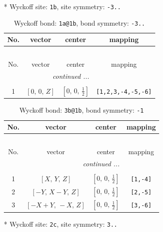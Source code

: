\documentclass[fleqn,8pt]{jsarticle}
\begin{document}
* Wyckoff site: {\tt 1b}, site symmetry: {\tt -3..}
\renewcommand{\arraystretch}{1.2}
\begin{longtable}{cccc}
\caption{Wyckoff bond: {\tt 1a@1b}, bond symmetry: {\tt -3..}}
 \\
 \hline \hline
No. & vector & center & mapping \\ \hline \endfirsthead

\multicolumn{3}{l}{\tablename\ \thetable{}} \\
 \hline \hline
No. & vector & center & mapping \\ \hline \endhead

 \hline \hline
\multicolumn{3}{r}{\footnotesize\it continued ...} \\ \endfoot

 \hline \hline
\multicolumn{3}{r}{} \\ \endlastfoot

1 & $\left[ 0,\, 0,\, Z \right]$ & $\left[ 0,\, 0,\, \frac{1}{2} \right]$ & {\tt [1,2,3,-4,-5,-6]} \\
\end{longtable}
\renewcommand{\arraystretch}{1.2}
\begin{longtable}{cccc}
\caption{Wyckoff bond: {\tt 3b@1b}, bond symmetry: {\tt -1}}
 \\
 \hline \hline
No. & vector & center & mapping \\ \hline \endfirsthead

\multicolumn{3}{l}{\tablename\ \thetable{}} \\
 \hline \hline
No. & vector & center & mapping \\ \hline \endhead

 \hline \hline
\multicolumn{3}{r}{\footnotesize\it continued ...} \\ \endfoot

 \hline \hline
\multicolumn{3}{r}{} \\ \endlastfoot

1 & $\left[ X,\, Y,\, Z \right]$ & $\left[ 0,\, 0,\, \frac{1}{2} \right]$ & {\tt [1,-4]} \\ \hline
2 & $\left[ - Y,\, X - Y,\, Z \right]$ & $\left[ 0,\, 0,\, \frac{1}{2} \right]$ & {\tt [2,-5]} \\ \hline
3 & $\left[ - X + Y,\, - X,\, Z \right]$ & $\left[ 0,\, 0,\, \frac{1}{2} \right]$ & {\tt [3,-6]} \\
\end{longtable}
* Wyckoff site: {\tt 2c}, site symmetry: {\tt 3..}
\renewcommand{\arraystretch}{1.2}
\end{document}

